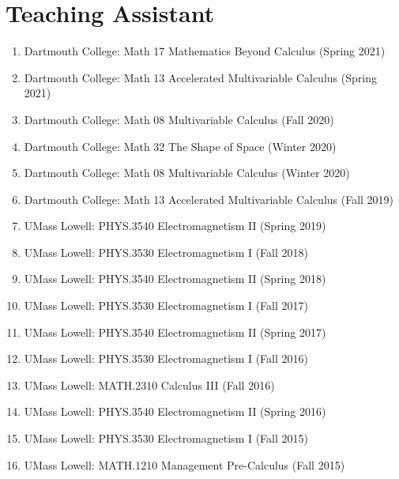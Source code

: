 \documentclass[a4paper,sans]{moderncv}
\begin{document}
    \section{Teaching Assistant}
        \begin{enumerate}
            \item
                Dartmouth College:
                Math 17 Mathematics Beyond Calculus (Spring 2021)
            \item
                Dartmouth College:
                Math 13 Accelerated Multivariable Calculus (Spring 2021)
            \item
                Dartmouth College:
                Math 08 Multivariable Calculus (Fall 2020)
            \item
                Dartmouth College:
                Math 32 The Shape of Space (Winter 2020)
            \item
                Dartmouth College:
                Math 08 Multivariable Calculus (Winter 2020)
            \item
                Dartmouth College:
                Math 13 Accelerated Multivariable Calculus (Fall 2019)
            \item
                UMass Lowell:
                PHYS.3540 Electromagnetism II (Spring 2019)
            \item
                UMass Lowell:
                PHYS.3530 Electromagnetism I (Fall 2018)
            \item
                UMass Lowell:
                PHYS.3540 Electromagnetism II (Spring 2018)
            \item
                UMass Lowell:
                PHYS.3530 Electromagnetism I (Fall 2017)
            \item
                UMass Lowell:
                PHYS.3540 Electromagnetism II (Spring 2017)
            \item
                UMass Lowell:
                PHYS.3530 Electromagnetism I (Fall 2016)
            \item
                UMass Lowell:
                MATH.2310 Calculus III (Fall 2016)
            \item
                UMass Lowell:
                PHYS.3540 Electromagnetism II (Spring 2016)
            \item
                UMass Lowell:
                PHYS.3530 Electromagnetism I (Fall 2015)
            \item
                UMass Lowell:
                MATH.1210 Management Pre-Calculus (Fall 2015)
        \end{enumerate}
\end{document}
